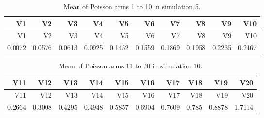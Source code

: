 \documentclass[11pt,]{article}
\begin{document}
\begin{longtable}[]{@{}rrrrrrrrrr@{}}
\caption{Mean of Poisson arms 1 to 10 in simulation 5.}\tabularnewline
\toprule
V1 & V2 & V3 & V4 & V5 & V6 & V7 & V8 & V9 & V10\tabularnewline
\midrule
\endfirsthead
\toprule
V1 & V2 & V3 & V4 & V5 & V6 & V7 & V8 & V9 & V10\tabularnewline
\midrule
\endhead
0.0072 & 0.0576 & 0.0613 & 0.0925 & 0.1452 & 0.1559 & 0.1869 & 0.1958 &
0.2235 & 0.2467\tabularnewline
\bottomrule
\end{longtable}

\begin{longtable}[]{@{}rrrrrrrrrr@{}}
\caption{Mean of Poisson arms 11 to 20 in simulation 10.}\tabularnewline
\toprule
V11 & V12 & V13 & V14 & V15 & V16 & V17 & V18 & V19 & V20\tabularnewline
\midrule
\endfirsthead
\toprule
V11 & V12 & V13 & V14 & V15 & V16 & V17 & V18 & V19 & V20\tabularnewline
\midrule
\endhead
0.2664 & 0.3008 & 0.4295 & 0.4948 & 0.5857 & 0.6904 & 0.7609 & 0.785 &
0.8878 & 1.7114\tabularnewline
\bottomrule
\end{longtable}
\end{document}
